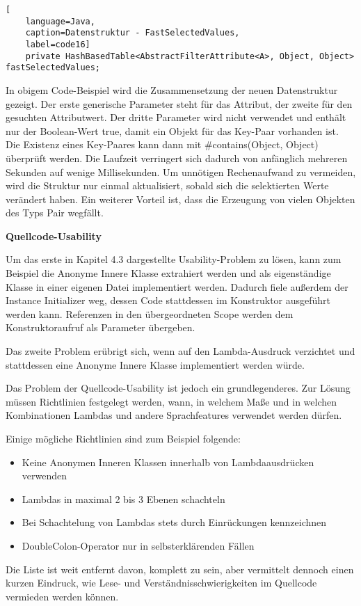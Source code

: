 \begin{lstlisting}[
    language=Java,
    caption=Datenstruktur - FastSelectedValues,
    label=code16]
	private HashBasedTable<AbstractFilterAttribute<A>, Object, Object> fastSelectedValues;
\end{lstlisting}

In obigem Code-Beispiel wird die Zusammensetzung der neuen Datenstruktur gezeigt. Der erste generische Parameter steht für das Attribut, der zweite für den gesuchten Attributwert. Der dritte Parameter wird nicht verwendet und enthält nur der Boolean-Wert true, damit ein Objekt für das Key-Paar vorhanden ist. Die Existenz eines Key-Paares kann dann mit \#contains(Object, Object) überprüft werden. Die Laufzeit verringert sich dadurch von anfänglich mehreren Sekunden auf wenige Millisekunden. Um unnötigen Rechenaufwand zu vermeiden, wird die Struktur nur einmal aktualisiert, sobald sich die selektierten Werte verändert haben. Ein weiterer Vorteil ist, dass die Erzeugung von vielen Objekten des Typs Pair wegfällt.

\textbf{Quellcode-Usability}

Um das erste in Kapitel 4.3 dargestellte Usability-Problem zu lösen, kann zum Beispiel die Anonyme Innere Klasse extrahiert werden und als eigenständige Klasse in einer eigenen Datei implementiert werden. Dadurch fiele außerdem der Instance Initializer weg, dessen Code stattdessen im Konstruktor ausgeführt werden kann. Referenzen in den übergeordneten Scope werden dem Konstruktoraufruf als Parameter übergeben.

Das zweite Problem erübrigt sich, wenn auf den Lambda-Ausdruck verzichtet und stattdessen eine Anonyme Innere Klasse implementiert werden würde.

Das Problem der Quellcode-Usability ist jedoch ein grundlegenderes. Zur Lösung müssen Richtlinien festgelegt werden, wann, in welchem Maße und in welchen Kombinationen Lambdas und andere Sprachfeatures verwendet werden dürfen.

Einige mögliche Richtlinien sind zum Beispiel folgende:

\begin{itemize}
	\item Keine Anonymen Inneren Klassen innerhalb von Lambdaausdrücken verwenden
	\item Lambdas in maximal 2 bis 3 Ebenen schachteln
	\item Bei Schachtelung von Lambdas stets durch Einrückungen kennzeichnen
	\item DoubleColon-Operator nur in selbsterklärenden Fällen
\end{itemize}

Die Liste ist weit entfernt davon, komplett zu sein, aber vermittelt dennoch einen kurzen Eindruck, wie Lese- und Verständnisschwierigkeiten im Quellcode vermieden werden können.
